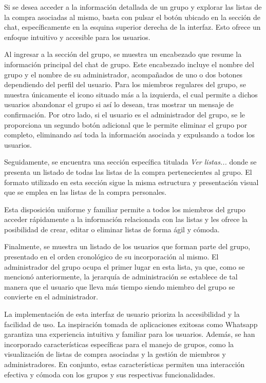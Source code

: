 \documentclass{article}
\begin{document}
Si se desea acceder a la información detallada de un grupo y explorar las listas de la compra asociadas al mismo, basta con pulsar el botón ubicado en la sección de chat, específicamente en la esquina superior derecha de la interfaz. Esto ofrece un enfoque intuitivo y accesible para los usuarios.

Al ingresar a la sección del grupo, se muestra un encabezado que resume la información principal del chat de grupo. Este encabezado incluye el nombre del grupo y el nombre de su administrador, acompañados de uno o dos botones dependiendo del perfil del usuario. Para los miembros regulares del grupo, se muestra únicamente el icono situado más a la izquierda, el cual permite a dichos usuarios abandonar el grupo si así lo desean, tras mostrar un mensaje de confirmación. Por otro lado, si el usuario es el administrador del grupo, se le proporciona un segundo botón adicional que le permite eliminar el grupo por completo, eliminando así toda la información asociada y expulsando a todos los usuarios.

Seguidamente, se encuentra una sección específica titulada \textit{Ver listas...} donde se presenta un listado de todas las listas de la compra pertenecientes al grupo. El formato utilizado en esta sección sigue la misma estructura y presentación visual que se emplea en las listas de la compra personales.

\newpage

Esta disposición uniforme y familiar permite a todos los miembros del grupo acceder rápidamente a la información relacionada con las listas y les ofrece la posibilidad de crear, editar o eliminar listas de forma ágil y cómoda.

Finalmente, se muestra un listado de los usuarios que forman parte del grupo, presentado en el orden cronológico de su incorporación al mismo. El administrador del grupo ocupa el primer lugar en esta lista, ya que, como se mencionó anteriormente, la jerarquía de administración se establece de tal manera que el usuario que lleva más tiempo siendo miembro del grupo se convierte en el administrador.

La implementación de esta interfaz de usuario prioriza la accesibilidad y la facilidad de uso. La inspiración tomada de aplicaciones exitosas como Whatsapp garantiza una experiencia intuitiva y familiar para los usuarios. Además, se han incorporado características específicas para el manejo de grupos, como la visualización de listas de compra asociadas y la gestión de miembros y administradores. En conjunto, estas características permiten una interacción efectiva y cómoda con los grupos y sus respectivas funcionalidades.
\end{document}

